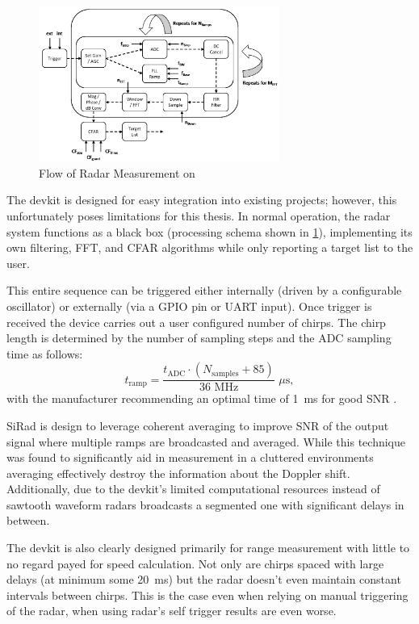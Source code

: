 \begin{figure}[h!]
  \centering
  \includegraphics[width=0.7\textwidth]{../img/sidar_flow.png}
  \caption[Flow of Radar Measurement on \sidar \cite{sidarPRO}]{Flow of Radar Measurement on \sidar \cite{sidarPRO}}
  \label{fig:sidarFlow}
\end{figure}

The devkit is designed for easy integration into existing projects; however, this unfortunately poses limitations for this thesis.
In normal operation, the radar system functions as a black box (processing schema shown in \ref{fig:sidarFlow}), implementing its own filtering, FFT, and CFAR algorithms while only reporting a target list to the user.

This entire sequence can be triggered either internally (driven by a configurable oscillator) or externally (via a GPIO pin or UART input).
Once trigger is received the device carries out a user configured number of chirps.
The chirp length is determined by the number of sampling steps and the ADC sampling time as follows:
\begin{equation}
  t_\mathrm{ramp} = \frac{t_\mathrm{ADC} \cdot  (N_\mathrm{samples} + 85)}{36\,\, \mathrm{MHz}} \,\, \mu\mathrm{s},
  \label{eq:sampling}
\end{equation}
with the manufacturer recommending an optimal time of 1~ms for good SNR \cite{sidarPRO}.

SiRad is design to leverage coherent averaging to improve SNR of the output signal where multiple ramps are broadcasted and averaged.
While this technique was found to significantly aid in measurement in a cluttered environments averaging effectively destroy the information about the Doppler shift.
Additionally, due to the devkit's limited computational resources instead of sawtooth waveform radars broadcasts a segmented one with significant delays in between\cite{sidarPRO}.

The devkit is also clearly designed primarily for range measurement with little to no regard payed for speed calculation.
Not only are chirps spaced with large delays (at minimum some 20~ms) but the radar doesn't even maintain constant intervals between chirps.
This is the case even when relying on manual triggering of the radar, when using radar's self trigger results are even worse.

